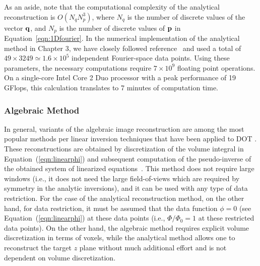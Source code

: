 As an aside, note that the computational complexity of the analytical reconstruction is $O(N_q N_p^3)$, where $N_q$ is the number of discrete values of the vector $\mathbf{q}$, and $N_p$ is the number of discrete values of $\mathbf{p}$ in Equation~\ref{eqn:1Dfourier}. In the numerical implementation of the analytical method in Chapter 3, we have closely followed reference~\cite{Konecky2008a} and used a total of $49\times3249\simeq1.6\times10^5$ independent Fourier-space data points. Using these parameters, the necessary computations require $7\times 10^{9}$ floating point operations. On a single-core Intel Core 2 Duo processor with a peak performance of 19 GFlops, this calculation translates to 7 minutes of computation time.

\subsubsection{Algebraic Method}
\label{sec:Algebraic}
\label{subsec:alg_rec}
In general, variants of the algebraic image reconstruction are among the most popular methods per linear inversion techniques that have been applied to DOT \cite{Kak1987,OLeary1995,Ntziachristos2000,Intes2002}. These reconstructions are obtained by discretization of the volume integral in Equation~(\ref{eqn:linearphi}) and subsequent computation of the pseudo-inverse of the obtained system of linearized equations~\cite{Gonatas1995}.  This method does not require large windows (i.e., it does not need the large field-of-views which are required by symmetry in the analytic inversions), and it can be used with any type of data restriction. For the case of the analytical reconstruction method, on the other hand, for data restriction, it must be assumed that the data function $\phi=0$ (see Equation~(\ref{eqn:linearphi}) at these data points (i.e., $\Phi / \Phi_0=1$ at these restricted data points). On the other hand, the algebraic method requires explicit volume discretization in terms of voxels, while the analytical method allows one to reconstruct the target $z$ plane without much additional effort and is not dependent on volume discretization.

